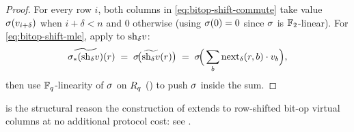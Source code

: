 \begin{proof}
For every row $i$, both columns in \cref{eq:bitop-shift-commute} take
value $\sigma(v_{i+\delta})$ when $i + \delta < n$ and $0$ otherwise
(using $\sigma(0) = 0$ since $\sigma$ is $\mathbb{F}_2$-linear). For
\cref{eq:bitop-shift-mle}, apply  to
$\mathrm{sh}_{\delta} v$:
\[
  \widetilde{\sigma_*(\mathrm{sh}_{\delta} v)}(r) \;=\; \sigma\!\big(\widetilde{\mathrm{sh}_{\delta} v}(r)\big)
  \;=\; \sigma\!\Big(\sum_b \mathrm{next}_\delta(r, b) \cdot v_b\Big),
\]
then use $\mathbb{F}_q$-linearity of $\sigma$ on $R_q$ ()
to push $\sigma$ inside the sum.
\end{proof}

 is the structural reason the
construction of  extends to row-shifted bit-op
virtual columns at no additional protocol cost: see
.
